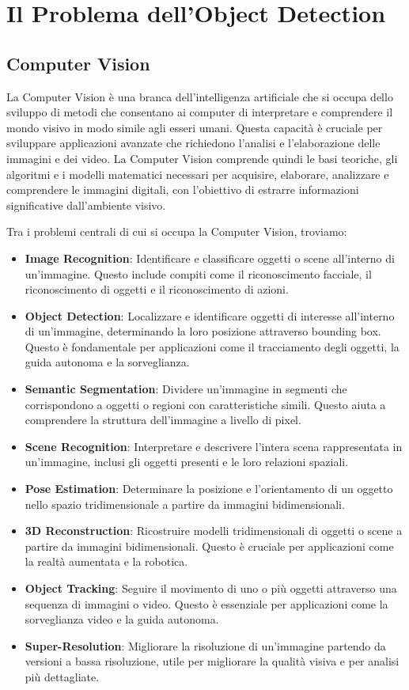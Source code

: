 \section{Il Problema dell'Object Detection}

\subsection{Computer Vision}
La Computer Vision è una branca dell'intelligenza artificiale che si occupa dello sviluppo di metodi che consentano ai computer di interpretare e comprendere il mondo visivo in modo simile agli esseri umani. Questa capacità è cruciale per sviluppare applicazioni avanzate che richiedono l'analisi e l'elaborazione delle immagini e dei video. La Computer Vision comprende quindi le basi teoriche, gli algoritmi e i modelli matematici necessari per acquisire, elaborare, analizzare e comprendere le immagini digitali, con l'obiettivo di estrarre informazioni significative dall'ambiente visivo.

Tra i problemi centrali di cui si occupa la Computer Vision, troviamo:
\begin{itemize}
  \item \textbf{Image Recognition}: Identificare e classificare oggetti o scene all'interno di un'immagine. Questo include compiti come il riconoscimento facciale, il riconoscimento di oggetti e il riconoscimento di azioni.
  \item \textbf{Object Detection}: Localizzare e identificare oggetti di interesse all'interno di un'immagine, determinando la loro posizione attraverso bounding box. Questo è fondamentale per applicazioni come il tracciamento degli oggetti, la guida autonoma e la sorveglianza.
  \item \textbf{Semantic Segmentation}: Dividere un'immagine in segmenti che corrispondono a oggetti o regioni con caratteristiche simili. Questo aiuta a comprendere la struttura dell'immagine a livello di pixel.
  \item \textbf{Scene Recognition}: Interpretare e descrivere l'intera scena rappresentata in un'immagine, inclusi gli oggetti presenti e le loro relazioni spaziali.
  \item \textbf{Pose Estimation}: Determinare la posizione e l'orientamento di un oggetto nello spazio tridimensionale a partire da immagini bidimensionali.
  \item \textbf{3D Reconstruction}: Ricostruire modelli tridimensionali di oggetti o scene a partire da immagini bidimensionali. Questo è cruciale per applicazioni come la realtà aumentata e la robotica.
  \item \textbf{Object Tracking}: Seguire il movimento di uno o più oggetti attraverso una sequenza di immagini o video. Questo è essenziale per applicazioni come la sorveglianza video e la guida autonoma.
  \item \textbf{Super-Resolution}: Migliorare la risoluzione di un'immagine partendo da versioni a bassa risoluzione, utile per migliorare la qualità visiva e per analisi più dettagliate.
\end{itemize}

